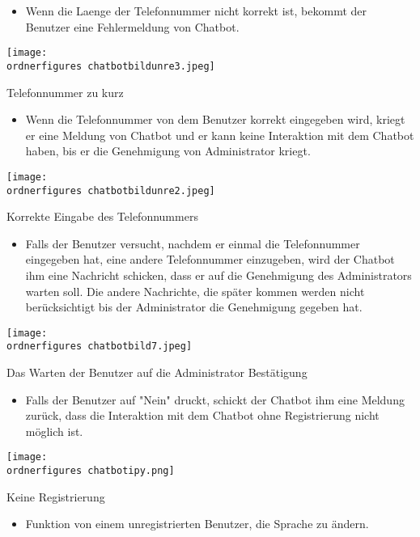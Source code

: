\begin{itemize}
	\item Wenn die Laenge der Telefonnummer nicht korrekt ist, bekommt der Benutzer eine Fehlermeldung von Chatbot.
\end{itemize}
\begin{center}
	\captionsetup{type=figure}
	\texttt{[image: \\ordnerfigures chatbotbildunre3.jpeg]}
	\caption{Telefonnummer zu kurz}
	\label{fig:crboregistrfds}
\end{center}
\begin{itemize}
	\item Wenn die Telefonnummer von dem Benutzer korrekt eingegeben wird, kriegt er eine Meldung von Chatbot und er kann keine Interaktion mit dem Chatbot haben, bis er die Genehmigung von Administrator kriegt.
\end{itemize}
\begin{center}
	\captionsetup{type=figure}
	\texttt{[image: \\ordnerfigures chatbotbildunre2.jpeg]}
	\caption{Korrekte Eingabe des Telefonnummers}
	\label{fig:crboreistrfds}
\end{center}
\begin{itemize}
	\item Falls der Benutzer versucht, nachdem er einmal die Telefonnummer eingegeben hat, eine andere Telefonnummer einzugeben, wird der Chatbot ihm eine Nachricht schicken, dass er auf die Genehmigung des Administrators warten soll. Die andere Nachrichte, die später kommen werden nicht berücksichtigt bis der Administrator die Genehmigung gegeben hat.
\end{itemize}
\begin{center}
	\captionsetup{type=figure}
	\texttt{[image: \\ordnerfigures chatbotbild7.jpeg]}
	\caption{Das Warten der Benutzer auf die Administrator Bestätigung}
	\label{fig:chat232bo53}
\end{center}
\begin{itemize}
	\item Falls der Benutzer auf "Nein" druckt, schickt der Chatbot ihm eine Meldung zur\"uck, dass die Interaktion mit dem Chatbot ohne Registrierung nicht m\"oglich ist.
\end{itemize}
\begin{center}
	\captionsetup{type=figure}
	\texttt{[image: \\ordnerfigures chatbotipy.png]}
	\caption{Keine Registrierung}
	\label{fig:chatffd3}
\end{center}
\begin{itemize}
	\item Funktion von einem unregistrierten Benutzer, die Sprache zu \"andern.
\end{itemize}
